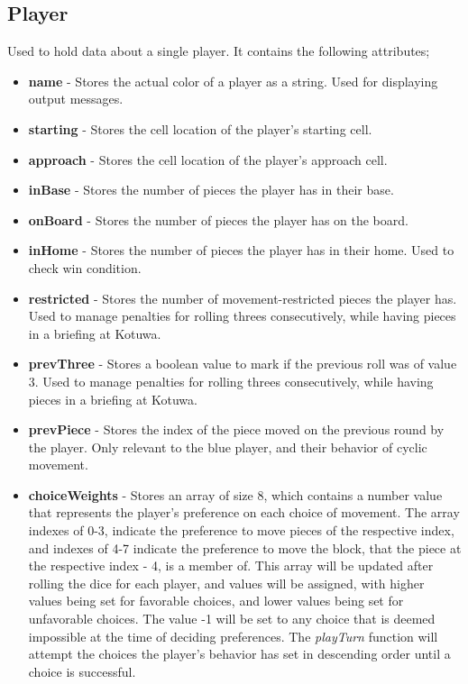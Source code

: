 \documentclass{article}
\begin{document}
\subsection{Player}
Used to hold data about a single player.
It contains the following attributes;
\begin{itemize}
    \item \textbf{name} - Stores the actual color of a player as a string. Used for displaying output messages.
    \item \textbf{starting} - Stores the cell location of the player's starting cell.
    \item \textbf{approach} - Stores the cell location of the player's approach cell.
    \item \textbf{inBase} - Stores the number of pieces the player has in their base.
    \item \textbf{onBoard} - Stores the number of pieces the player has on the board.
    \item \textbf{inHome} - Stores the number of pieces the player has in their home. Used to check win condition.
    \item \textbf{restricted} - Stores the number of movement-restricted pieces the player has. Used to manage penalties for rolling threes consecutively, while having pieces in a briefing at Kotuwa.
    \item \textbf{prevThree} - Stores a boolean value to mark if the previous roll was of value 3. Used to manage penalties for rolling threes consecutively, while having pieces in a briefing at Kotuwa.
    \item \textbf{prevPiece} - Stores the index of the piece moved on the previous round by the player. Only relevant to the blue player, and their behavior of cyclic movement.
    \item \textbf{choiceWeights} - Stores an array of size 8, which contains a number value that represents the player's preference on each choice of movement. The array indexes of 0-3, indicate the preference to move pieces of the respective index, and indexes of 4-7 indicate the preference to move the block, that the piece at the respective index - 4, is a member of. This array will be updated after rolling the dice for each player, and values will be assigned, with higher values being set for favorable choices, and lower values being set for unfavorable choices. The value -1 will be set to any choice that is deemed impossible at the time of deciding preferences. The \textit{playTurn} function will attempt the choices the player's behavior has set in descending order until a choice is successful.
\end{itemize}
\end{document}
